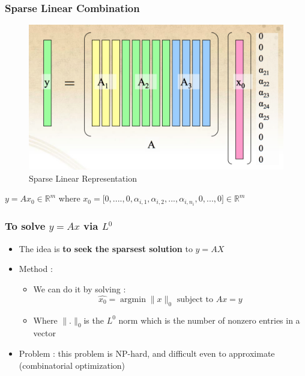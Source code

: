 \documentclass{beamer}
\DeclareMathOperator{\argmin}{argmin} %
\begin{document}
\begin{frame}

		\frametitle{Sparse Linear Combination}		
			
			\begin{figure}[!ht]
			\begin{center}
			\includegraphics[scale=0.4]{sparse.png}
			\end{center}
			\caption{Sparse Linear Representation}
			\label{ma}
			\end{figure}
			
$y=Ax_{0}  \in \mathbb{R}^{m} $ where  $x_{0}=\lbrack 0,....,0,\alpha_{i,1},\alpha_{i,2},...,\alpha_{i,n_{i}},0,...,0  \rbrack \in \mathbb{R}^{m}$

\end{frame}

		
\begin{frame}

		\frametitle{To solve $y=Ax$ via $L^{0}$}		
			
\begin{itemize}
\item The idea is \textbf{to seek the sparsest solution} to $y=AX$
\item Method :
	\begin{itemize}
	\item We can do it by solving : 
	$$ \hat{x_{0}}= \argmin \|x\|_{0}  \mbox{ subject to } Ax=y$$
	\item Where $\|.\|_{0} $is the $L^{0}$ norm which is the number of nonzero entries in a vector
	\end{itemize}
\item Problem : this problem is NP-hard, and difficult even to approximate (combinatorial optimization)


\end{itemize}

\end{frame}
\end{document}
